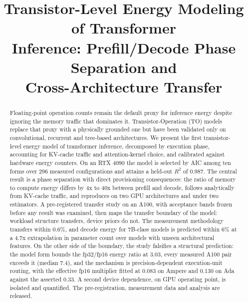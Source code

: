 \documentclass[conference]{IEEEtran}
\begin{document}
\title{Transistor-Level Energy Modeling of Transformer\\Inference: Prefill/Decode Phase Separation and\\Cross-Architecture Transfer}

\author{
\and
{}
}

\maketitle
{}

\begin{abstract}
Floating-point operation counts remain the default proxy for inference energy
despite ignoring the memory traffic that dominates it. Transistor-Operation
(TO) models replace that proxy with a physically grounded one but have been
validated only on convolutional, recurrent and tree-based architectures. We
present the first transistor-level energy model of transformer inference,
decomposed by execution phase, accounting for KV-cache traffic and
attention-kernel choice, and calibrated against hardware energy counters. On
an RTX 4090 the model is selected by AIC among ten forms over 296 measured
configurations and attains a held-out $R^2$ of 0.987. The central result is
a phase separation with direct provisioning consequences: the ratio of
memory to compute energy differs by 4x to 40x between prefill and decode,
follows analytically from KV-cache traffic, and reproduces on two GPU
architectures and under two estimators. A pre-registered transfer study on
an A100, with acceptance bands frozen before any result was examined, then
maps the transfer boundary of the model: workload structure transfers,
device priors do not. The measurement methodology transfers within 0.6\%,
and decode energy for 7B-class models is predicted within 6\% at a 4.7x
extrapolation in parameter count over models with unseen architectural
features. On the other side of the boundary, the study falsifies a
structural prediction: the model form bounds the fp32/fp16 energy ratio at
3.03, every measured A100 pair exceeds it (median 7.4), and the mechanism is
precision-dependent execution-unit routing, with the effective fp16
multiplier fitted at 0.083 on Ampere and 0.130 on Ada against the asserted
0.33. A second device dependence, on GPU operating point, is isolated and
quantified. The pre-registration, measurement data and analysis are
released.
\end{abstract}
\end{document}
